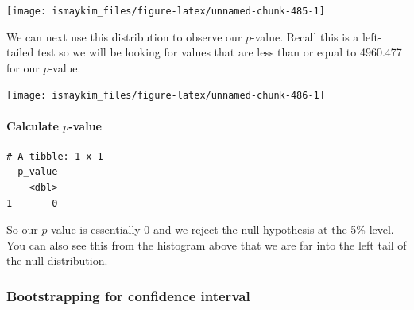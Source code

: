 \documentclass[12pt, krantz2,]{krantz}
\makeatletter
\newenvironment{Shaded}{\begin{snugshade}}{\end{snugshade}}
\newcommand{\DataTypeTok}[1]{\textcolor[rgb]{0.27,0.27,0.27}{#1}}
\newcommand{\KeywordTok}[1]{\textcolor[rgb]{0.27,0.27,0.27}{\textbf{#1}}}
\newcommand{\NormalTok}[1]{#1}
\newcommand{\OperatorTok}[1]{\textcolor[rgb]{0.43,0.43,0.43}{\textbf{#1}}}
\newcommand{\StringTok}[1]{\textcolor[rgb]{0.5,0.5,0.5}{#1}}
\let\oldparagraph\paragraph
\renewcommand{\paragraph}[1]{\oldparagraph{#1}\mbox{}}
\newenvironment{kframe}{%
\medskip{}
\setlength{\fboxsep}{.8em}
 \def\at@end@of@kframe{}%
 \ifinner\ifhmode%
  \def\at@end@of@kframe{\end{minipage}}%
  \begin{minipage}{\columnwidth}%
 \fi\fi%
 \def\FrameCommand##1{\hskip\@totalleftmargin \hskip-\fboxsep
 \colorbox{shadecolor}{##1}\hskip-\fboxsep
     \hskip-\linewidth \hskip-\@totalleftmargin \hskip\columnwidth}%
 \MakeFramed {\advance\hsize-\width
   \@totalleftmargin\z@ \linewidth\hsize
   \@setminipage}}%
 {\par\unskip\endMakeFramed%
 \at@end@of@kframe}
\renewenvironment{Shaded}{\begin{kframe}}{\end{kframe}}
\makeatother
\begin{document}
\begin{center}\texttt{[image: ismaykim\_files/figure-latex/unnamed-chunk-485-1]} \end{center}

We can next use this distribution to observe our \(p\)-value. Recall this is a left-tailed test so we will be looking for values that are less than or equal to 4960.477 for our \(p\)-value.

\begin{Shaded}
\end{Shaded}

\begin{center}\texttt{[image: ismaykim\_files/figure-latex/unnamed-chunk-486-1]} \end{center}

\hypertarget{calculate-p-value-4}{%
\paragraph{\texorpdfstring{Calculate \(p\)-value}{Calculate p-value}}\label{calculate-p-value-4}}

\begin{Shaded}
\end{Shaded}

\begin{verbatim}
# A tibble: 1 x 1
  p_value
    <dbl>
1       0
\end{verbatim}

So our \(p\)-value is essentially 0 and we reject the null hypothesis at the 5\% level. You can also see this from the histogram above that we are far into the left tail of the null distribution.

\hypertarget{bootstrapping-for-confidence-interval-4}{%
\subsubsection*{Bootstrapping for confidence interval}\label{bootstrapping-for-confidence-interval-4}}
\end{document}
